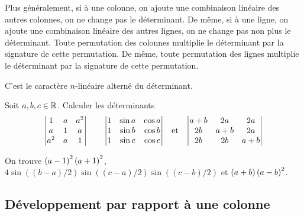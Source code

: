 \documentclass{magnolia}
\begin{document}
\begin{remarques}
\remarque Plus généralement, si à une colonne, on ajoute une combinaison linéaire des autres
  colonnes, on ne change pas le déterminant. De même, si à une ligne, on ajoute une
  combinaison linéaire des autres lignes, on ne change pas non plus le déterminant.
\remarque Toute permutation des colonnes multiplie le déterminant par la signature
  de cette permutation. De même, toute permutation des lignes multiplie le déterminant
  par la signature de cette permutation.
\end{remarques}

\begin{preuve}
C'est le caractère $n$-linéaire alterné du déterminant.
\end{preuve}

%
\vspace{2ex}
\begin{exoUnique}
\exo Soit $a,b,c\in\mathbb{R}$. Calculer les déterminants
  \[\begin{vmatrix}
    1 & a & a^2\\
    a & 1 & a\\
    a^2 & a & 1
    \end{vmatrix} \qquad
  \begin{vmatrix}
  1 & \sin a & \cos a\\
  1 & \sin b & \cos b\\
  1 & \sin c & \cos c
  \end{vmatrix}\quad\!\text{et}\quad\!
  \begin{vmatrix}
    a+b & 2a & 2a\\
    2b & a+b & 2a\\
    2b & 2b & a+b
    \end{vmatrix}\]
  \begin{sol}
  On trouve $\left(a-1\right)^2\left(a+1\right)^2$, $4\sin((b-a)/2)\sin((c-a)/2)\sin((c-b)/2)$ et
  $\left(a+b\right)\left(a-b\right)^2$.    
  \end{sol}
\end{exoUnique}

\subsection{Développement par rapport à une colonne}
\end{document}
